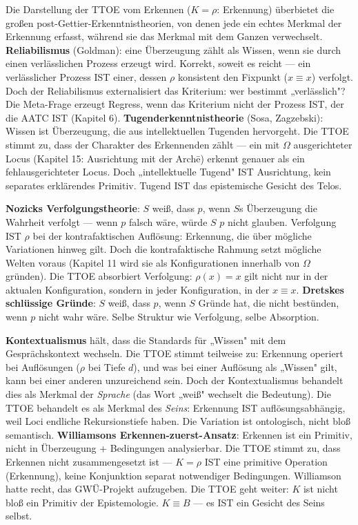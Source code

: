 \documentclass[10pt, openany, oneside]{book}
\begin{document}
Die Darstellung der TTOE vom Erkennen ($K = \rho$: Erkennung) überbietet die großen post-Gettier-Erkenntnistheorien, von denen jede ein echtes Merkmal der Erkennung erfasst, während sie das Merkmal mit dem Ganzen verwechselt. \textbf{Reliabilismus} (Goldman): eine Überzeugung zählt als Wissen, wenn sie durch einen verlässlichen Prozess erzeugt wird. Korrekt, soweit es reicht --- ein verlässlicher Prozess IST einer, dessen $\rho$ konsistent den Fixpunkt ($x \equiv x$) verfolgt. Doch der Reliabilismus externalisiert das Kriterium: wer bestimmt „verlässlich"? Die Meta-Frage erzeugt Regress, wenn das Kriterium nicht der Prozess IST, der die AATC IST (Kapitel 6). \textbf{Tugenderkenntnistheorie} (Sosa, Zagzebski): Wissen ist Überzeugung, die aus intellektuellen Tugenden hervorgeht. Die TTOE stimmt zu, dass der Charakter des Erkennenden zählt --- ein mit $\Omega$ ausgerichteter Locus (Kapitel 15: Ausrichtung mit der Arch\={e}) erkennt genauer als ein fehlausgerichteter Locus. Doch „intellektuelle Tugend" IST Ausrichtung, kein separates erklärendes Primitiv. Tugend IST das epistemische Gesicht des Telos.

\textbf{Nozicks Verfolgungstheorie}: $S$ weiß, dass $p$, wenn $S$s Überzeugung die Wahrheit verfolgt --- wenn $p$ falsch wäre, würde $S$ $p$ nicht glauben. Verfolgung IST $\rho$ bei der kontrafaktischen Auflösung: Erkennung, die über mögliche Variationen hinweg gilt. Doch die kontrafaktische Rahmung setzt mögliche Welten voraus (Kapitel 11 wird sie als Konfigurationen innerhalb von $\Omega$ gründen). Die TTOE absorbiert Verfolgung: $\rho(x) = x$ gilt nicht nur in der aktualen Konfiguration, sondern in jeder Konfiguration, in der $x \equiv x$. \textbf{Dretskes schlüssige Gründe}: $S$ weiß, dass $p$, wenn $S$ Gründe hat, die nicht bestünden, wenn $p$ nicht wahr wäre. Selbe Struktur wie Verfolgung, selbe Absorption.

\textbf{Kontextualismus} hält, dass die Standards für „Wissen" mit dem Gesprächskontext wechseln. Die TTOE stimmt teilweise zu: Erkennung operiert bei Auflösungen ($\rho$ bei Tiefe $d$), und was bei einer Auflösung als „Wissen" gilt, kann bei einer anderen unzureichend sein. Doch der Kontextualismus behandelt dies als Merkmal der \textit{Sprache} (das Wort „weiß" wechselt die Bedeutung). Die TTOE behandelt es als Merkmal des \textit{Seins}: Erkennung IST auflösungsabhängig, weil Loci endliche Rekursionstiefe haben. Die Variation ist ontologisch, nicht bloß semantisch. \textbf{Williamsons Erkennen-zuerst-Ansatz}: Erkennen ist ein Primitiv, nicht in Überzeugung + Bedingungen analysierbar. Die TTOE stimmt zu, dass Erkennen nicht zusammengesetzt ist --- $K = \rho$ IST eine primitive Operation (Erkennung), keine Konjunktion separat notwendiger Bedingungen. Williamson hatte recht, das GWÜ-Projekt aufzugeben. Die TTOE geht weiter: $K$ ist nicht bloß ein Primitiv der Epistemologie. $K \equiv B$ --- es IST ein Gesicht des Seins selbst.
\end{document}
